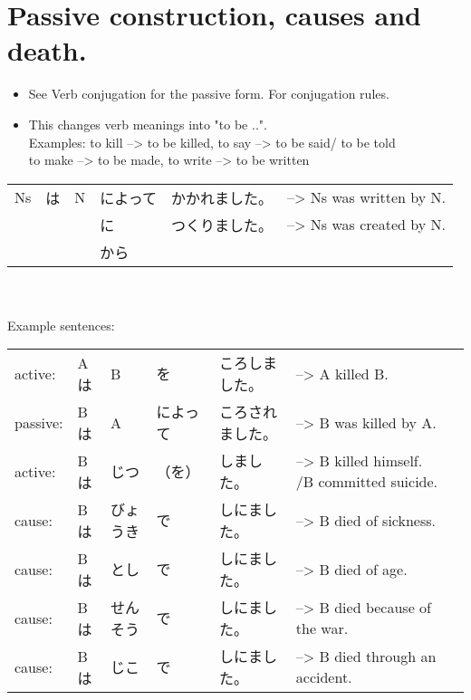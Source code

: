 \documentclass{article}
\begin{document}
\section{Passive construction, causes and death.}
\begin{itemize}
\item See Verb conjugation for the passive form. For conjugation rules.
\item This changes verb meanings into "to be ..". \\
    Examples: to kill --> to be killed, to say --> to be said/ to be told \\
              to make --> to be made, to write --> to be written \\
\end{itemize}
\begin{tabular}{ l | l | l | l | l | l }
Ns & は & N & によって & かかれました。 &--> Ns was written by N. \\
&&&に&つくりました。&--> Ns was created by N. \\
&&&から&& 
\end{tabular} \\
\vspace{2 mm} \\
Example sentences: \\
\begin{tabular}{ l | l | l | l | l | l | l }
active:&Aは&B&を&ころしました。&--> A killed B. \\ %
passive:&Bは&A&によって&ころされました。&--> B was killed by A. \\ %
active:&Bは&じつ&（を）&しました。&--> B killed himself. /B committed suicide. \\ %
cause:&Bは&びょうき&で&しにました。&--> B died of sickness. \\ %
cause:&Bは&とし&で&しにました。&--> B died of age. \\ %
cause:&Bは&せんそう&で&しにました。&--> B died because of the war. \\ %
cause:&Bは&じこ&で&しにました。&--> B died through an accident. 
\end{tabular}    
\end{document}
